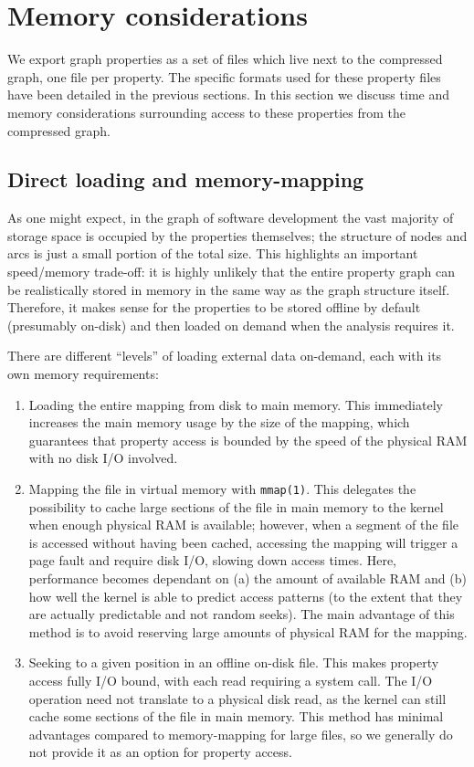 \section{Memory considerations}

We export graph properties as a set of files which live next to the compressed
graph, one file per property. The specific formats used for these property
files have been detailed in the previous sections. In this section we discuss
time and memory considerations surrounding access to these properties from the
compressed graph.

\subsection{Direct loading and memory-mapping}

As one might expect, in the graph of software development the vast majority of
storage space is occupied by the properties themselves; the structure of nodes
and arcs is just a small portion of the total size. This highlights an
important speed/memory trade-off: it is highly unlikely that the entire
property graph can be realistically stored in memory in the same way as the
graph structure itself. Therefore, it makes sense for the properties to be
stored offline by default (presumably on-disk) and then loaded on demand
when the analysis requires it.

There are different ``levels'' of loading external data on-demand, each with
its own memory requirements:

\begin{enumerate}
    \item Loading the entire mapping from disk to main memory. This immediately
        increases the main memory usage by the size of the mapping, which
        guarantees that property access is bounded by the speed of the physical
        RAM with no disk I/O involved.
    \item Mapping the file in virtual memory with \texttt{mmap(1)}. This
        delegates the possibility to cache large sections of the file in main
        memory to the kernel when enough physical RAM is available; however,
        when a segment of the file is accessed without having been cached,
        accessing the mapping will trigger a page fault and require disk I/O,
        slowing down access times.
        Here, performance becomes dependant on (a) the amount of available RAM
        and (b) how well the kernel is able to predict access patterns (to the
        extent that they are actually predictable and not random seeks).
        The main advantage of this method is to avoid reserving large amounts
        of physical RAM for the mapping.
    \item Seeking to a given position in an offline on-disk file. This makes
        property access fully I/O bound, with each read requiring a system
        call. The I/O operation need not translate to a physical disk read, as
        the kernel can still cache some sections of the file in main memory.
        This method has minimal advantages compared to memory-mapping for large
        files, so we generally do not provide it as an option for property
        access.
\end{enumerate}

